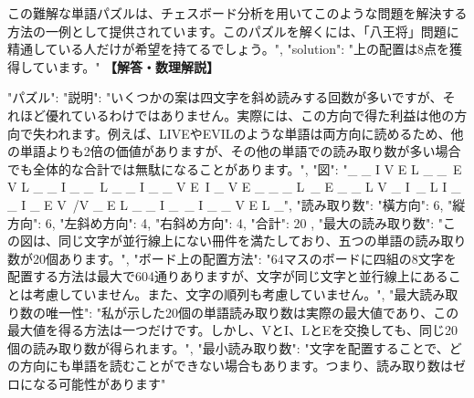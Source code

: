 \documentclass[10pt,a4paper,oneside,openany]{ltjsbook}
\begin{document}
\begin{tcolorbox}[colback=softblue,colframe=primaryblue,title=\textbf{第 303 問：UNDER THE VEIL.},arc=2mm,boxrule=1pt,breakable]
{この難解な単語パズルは、チェスボード分析を用いてこのような問題を解決する方法の一例として提供されています。このパズルを解くには、「八王将」問題に精通している人だけが希望を持てるでしょう。",
  "solution": "上の配置は8点を獲得しています。"
}
\tcblower
\textbf{【解答・数理解説】}\par\vspace{0.3em}
{
  "パズル": {
    "説明": "いくつかの案は四文字を斜め読みする回数が多いですが、それほど優れているわけではありません。実際には、この方向で得た利益は他の方向で失われます。例えば、LIVEやEVILのような単語は両方向に読めるため、他の単語よりも2倍の価値がありますが、その他の単語での読み取り数が多い場合でも全体的な合計では無駄になることがあります。",
    "図": "\_ \_ I V E L \_ \_\
E V L \_ \_ I \_ \_\
L \_ \_ I \_ \_ V E\
I \_ V E \_ \_ \_ L\
\_ E \_ \_ L V \_ I\
\_ L I \_ \_ I \_ E V\
/V \_ E L \_ \_ I \_\
\_ I \_ \_ V E L \_",
    "読み取り数": {
      "橫方向": 6,
      "縦方向": 6,
      "左斜め方向": 4,
      "右斜め方向": 4,
      "合計": 20
    },
    "最大の読み取り数": "この図は、同じ文字が並行線上にない冊件を満たしており、五つの単語の読み取り数が20個あります。",
    "ボード上の配置方法": "64マスのボードに四組の8文字を配置する方法は最大で604通りありますが、文字が同じ文字と並行線上にあることは考慮していません。また、文字の順列も考慮していません。",
    "最大読み取り数の唯一性": "私が示した20個の単語読み取り数は実際の最大値であり、この最大値を得る方法は一つだけです。しかし、VとI、LとEを交換しても、同じ20個の読み取り数が得られます。",
    "最小読み取り数": "文字を配置することで、どの方向にも単語を読むことができない場合もあります。つまり、読み取り数はゼロになる可能性があります"
  }
}
\end{tcolorbox}
\end{document}
